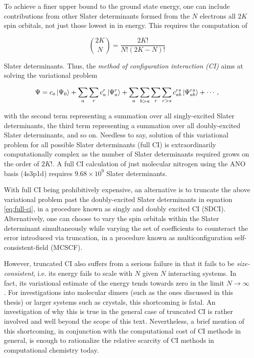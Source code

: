 To achieve a finer upper bound to the ground state energy, one can include
contributions from other Slater determinants formed from the $N$ electrons all
$2K$ spin orbitals, not just those lowest in in energy. This requires the
computation of

\begin{equation}
	\binom{2K}{N} = \frac{2K!}{N!(2K - N)!}
\end{equation}

\noindent Slater determinants. Thus, the \emph{method of configuration
interaction (CI)} aims at solving the variational problem

\begin{equation}
	\Psi = c_o \ket{\Psi_0} +  \sum_{a} \sum_{r} c_a^r \ket{\Psi_a^r}
	+ \sum_{a} \sum_{b > a} \sum_{r} \sum_{r > s} c_{ab}^{rs} \ket{\Psi_{ab}^{rs}}
	+ \cdots,
\label{eq:full-ci}
\end{equation}

\noindent with the second term representing a summation over all singly-excited
Slater determinants, the third term representing a summation over all
doubly-excited Slater determinants, and so on. Needless to say, solution of this
variational problem for all possible Slater determinants (full CI) is
extraordinarily computationally complex as the number of Slater determinants
required grows on the order of $2K!$. A full CI calculation of just molecular
nitrogen using the ANO basis (4s3p1d) requires $9.68 \times 10^9$ Slater
determinants. \cite{n2-ci}

With full CI being prohibitively expensive, an alternative is to truncate the
above variational problem past the doubly-excited Slater determinants in
equation \ref{eq:full-ci}, in a procedure known as singly and doubly excited CI
(SDCI). Alternatively, one can choose to vary the spin orbitals within the
Slater determinant simultaneously while varying the set of coefficients to
counteract the error introduced via truncation, in a procedure known as
multiconfiguration self-consistent-field (MCSCF).

However, truncated CI also suffers from a serious failure in that it fails to be
\emph{size-consistent}, i.e. its energy fails to scale with $N$ given $N$
interacting systems. In fact, its variational estimate of the energy tends
towards zero in the limit $N \rightarrow \infty$. For investigations into
molecular dimers (such as the ones discussed in this thesis) or larger systems
such as crystals, this shortcoming is fatal.  An investigation of why this is
true in the general case of truncated CI is rather involved and well beyond the
scope of this text.  Nevertheless, a brief mention of this shortcoming, in
conjunction with the computational cost of CI methods in general, is enough to
rationalize the relative scarcity of CI methods in computational chemistry
today.

